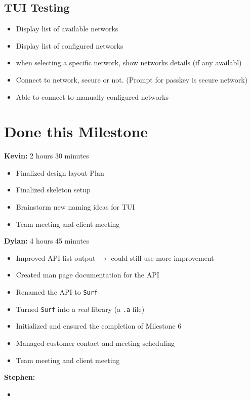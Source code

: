\documentclass[11pt]{article}
\begin{document}
\subsection*{TUI Testing}
\begin{itemize}
  \item Display list of available networks
  \item Display list of configured networks
  \item when selecting a specific network, show networks details (if any availabl)
  \item Connect to network, secure or not. (Prompt for passkey is secure network)
  \item Able to connect to manually configured networks
\end{itemize}

\section*{Done this Milestone}

\textbf{Kevin:} 2 hours 30 minutes
\begin{itemize}
  \item Finalized design layout Plan
  \item Finalized skeleton setup
  \item Brainstorm new naming ideas for TUI
  \item Team meeting and client meeting
\end{itemize}

\textbf{Dylan:} 4 hours 45 minutes
\begin{itemize}
  \item Improved API list output $\rightarrow$ could still use more improvement
  \item Created man page documentation for the API
  \item Renamed the API to \texttt{Surf}
  \item Turned \texttt{Surf} into a \textit{real} library (a \texttt{.a} file)
  \item Initialized and ensured the completion of Milestone 6
  \item Managed customer contact and meeting scheduling
  \item Team meeting and client meeting
\end{itemize}

\textbf{Stephen:}
\begin{itemize}
  \item
\end{itemize}
\end{document}
